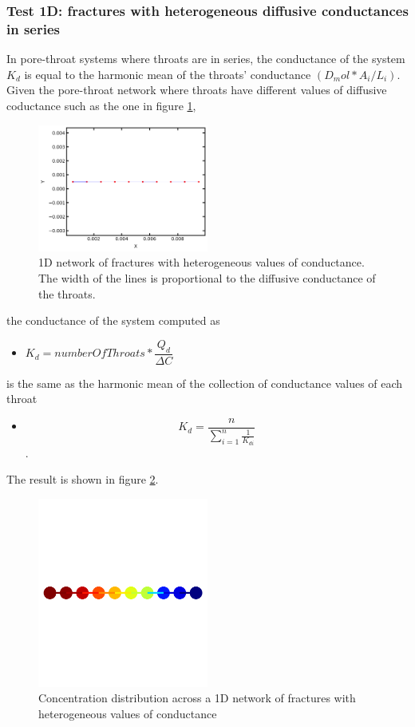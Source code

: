 \documentclass{article}
\begin{document}
\subsubsection{Test 1D: fractures with heterogeneous diffusive conductances in series}
In pore-throat systems where throats are in series, the conductance of the system $K_d$ is equal to the harmonic mean of the throats' conductance $(D_mol*A_i/L_i)$.
Given the pore-throat network where throats have different values of diffusive coductance such as the one in figure \ref{fig:Network1Dhet},
\begin{figure}[h]
    \centering
    \includegraphics[width=0.5\textwidth]{images/fromOpenPNM/hetNetwork1D.png}
    \caption{1D network of fractures with heterogeneous values of conductance. The width of the lines is proportional to the diffusive conductance of the throats.}
    \label{fig:Network1Dhet}
\end{figure}
the conductance of the system computed as
\begin{itemize}
    \item $K_d = numberOfThroats * \dfrac{Q_d}{\Delta C}$
\end{itemize}
is the same as the harmonic mean of the collection of conductance values of each throat
\begin{itemize}
    \item \[ K_d = \frac{n}{\sum_{i=1}^n\frac{1}{K_{di}}} \].
\end{itemize}
The result is shown in figure \ref{fig:Network1Dconc}.
\begin{figure}[h]
    \centering
    \includegraphics[width=0.5\textwidth]{images/fromOpenPNM/hetNetwork1DConc.png}
    \caption{Concentration distribution across a 1D network of fractures with heterogeneous values of conductance}
    \label{fig:Network1Dconc}
\end{figure}
\end{document}
